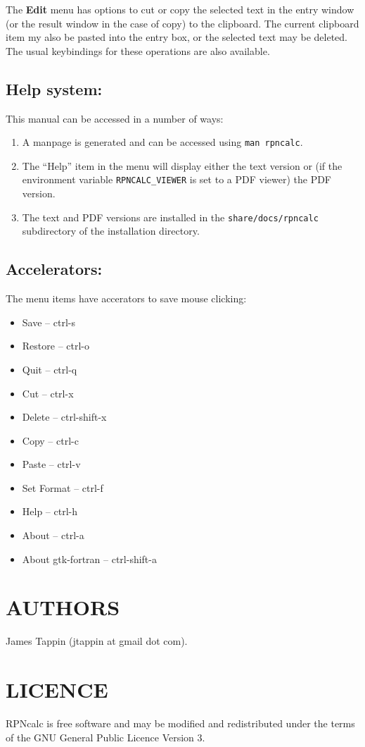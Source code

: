 \documentclass{article}
\begin{document}
The \textbf{Edit} menu has options to cut or copy the selected text in
the entry window (or the result window in the case of copy) to the
clipboard. The current clipboard item my also be pasted into the entry
box, or the selected text may be deleted. The usual keybindings for
these operations are also available.

\subsection{Help system:}

This manual can be accessed in a number of ways:
\begin{enumerate}
\item A manpage is generated and can be accessed using 
\texttt{man rpncalc}.
\item The ``Help'' item in the menu will display either the text
  version or (if the environment variable \texttt{RPNCALC\_VIEWER} is
  set to a PDF viewer) the PDF version.
\item The text and PDF versions are installed in the
  \texttt{share/docs/rpncalc} subdirectory of the installation directory.
\end{enumerate}

\subsection{Accelerators:}

The menu items have accerators to save mouse clicking:

\begin{itemize}
\item Save -- ctrl-s
\item Restore -- ctrl-o
\item Quit -- ctrl-q
\item Cut -- ctrl-x
\item Delete -- ctrl-shift-x
\item Copy -- ctrl-c
\item Paste -- ctrl-v
\item Set Format -- ctrl-f
\item Help -- ctrl-h
\item About -- ctrl-a
\item About gtk-fortran -- ctrl-shift-a
\end{itemize}

\section{AUTHORS}

James Tappin (jtappin at gmail dot com).

\section{LICENCE}

RPNcalc is free software and may be modified and redistributed under
the terms of the GNU General Public Licence Version 3.

\LatexManEnd
\end{document}
